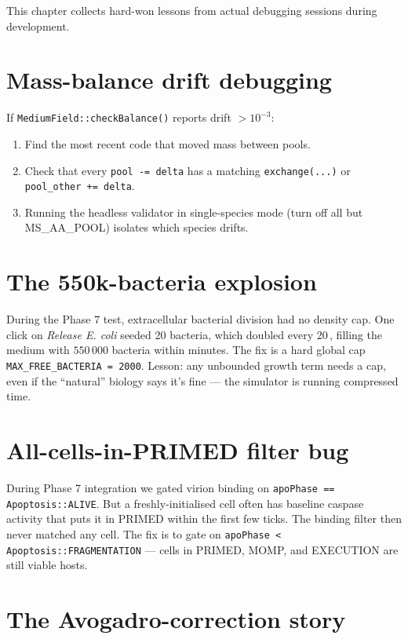 \documentclass[11pt,letterpaper,twoside,openany]{book}
\newcommand{\code}[1]{\texttt{#1}}
\newcommand{\biomin}{\text{bio-min}}
\begin{document}
This chapter collects hard-won lessons from actual debugging
sessions during development.

\section{Mass-balance drift debugging}

If \code{MediumField::checkBalance()} reports drift $> 10^{-3}$:
\begin{enumerate}
  \item Find the most recent code that moved mass between pools.
  \item Check that every \code{pool -= delta} has a matching
        \code{exchange(...)} or \code{pool\_other += delta}.
  \item Running the headless validator in single-species mode
        (turn off all but MS\_AA\_POOL) isolates which species
        drifts.
\end{enumerate}

\section{The 550k-bacteria explosion}

During the Phase 7 test, extracellular bacterial division had no
density cap. One click on \emph{Release E. coli} seeded 20
bacteria, which doubled every 20\,\biomin, filling the medium with
$550\,000$ bacteria within minutes. The fix is a hard global cap
\code{MAX\_FREE\_BACTERIA = 2000}. Lesson: any unbounded
growth term needs a cap, even if the ``natural'' biology says it's
fine --- the simulator is running compressed time.

\section{All-cells-in-PRIMED filter bug}

During Phase 7 integration we gated virion binding on
\code{apoPhase == Apoptosis::ALIVE}. But a freshly-initialised cell
often has baseline caspase activity that puts it in PRIMED within
the first few ticks. The binding filter then never matched any
cell. The fix is to gate on
\code{apoPhase < Apoptosis::FRAGMENTATION} --- cells in PRIMED,
MOMP, and EXECUTION are still viable hosts.

\section{The Avogadro-correction story}
\end{document}
